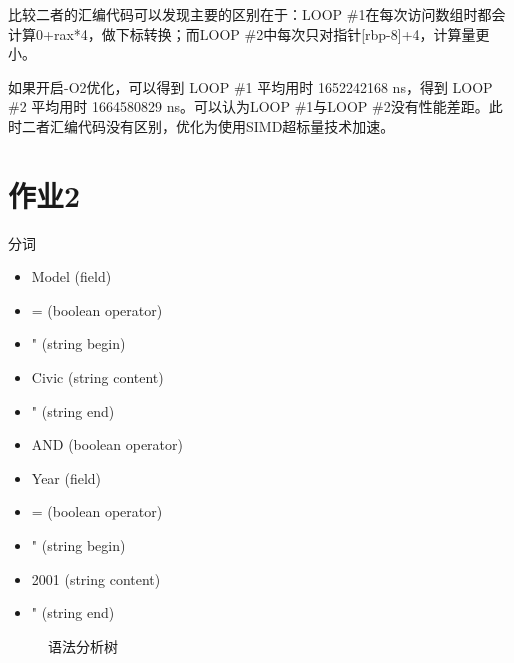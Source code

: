 \documentclass[UTF8,a4paper,10pt]{ctexart}
\begin{document}
比较二者的汇编代码可以发现主要的区别在于：LOOP \#1在每次访问数组时都会计算0+rax*4，做下标转换；而LOOP \#2中每次只对指针[rbp-8]+4，计算量更小。

如果开启-O2优化，可以得到 LOOP \#1 平均用时 1652242168 ns，得到 LOOP \#2 平均用时 1664580829 ns。可以认为LOOP \#1与LOOP \#2没有性能差距。此时二者汇编代码没有区别，优化为使用SIMD超标量技术加速。

\section{作业2}
分词
\begin{itemize}
  \item Model (field)
  \item = (boolean operator)
  \item " (string begin)
  \item Civic (string content)
  \item " (string end)
  \item AND (boolean operator)
  \item Year (field)
  \item = (boolean operator)
  \item " (string begin)
  \item 2001 (string content)
  \item " (string end)
\end{itemize}

\begin{figure}[H]
  \centering
  
  \caption{语法分析树}
\end{figure}
\end{document}
